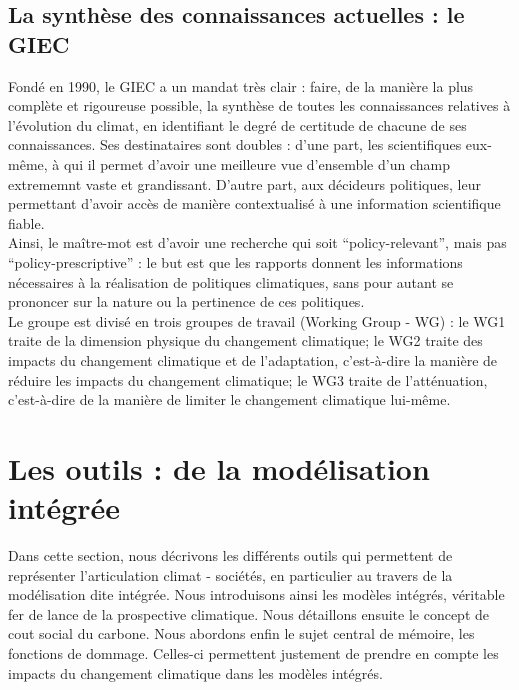 \subsection{La synthèse des connaissances actuelles : le GIEC}
\label{sect:1.2.3}

Fondé en 1990, le \Gls{GIEC} a un mandat très clair : faire, de la manière la plus complète et rigoureuse possible, la synthèse de toutes les connaissances relatives à l'évolution du climat, en identifiant le degré de certitude de chacune de ses connaissances. Ses destinataires sont doubles : d'une part, les scientifiques eux-même, à qui il permet d'avoir une meilleure vue d'ensemble d'un champ extrememnt vaste et grandissant. D'autre part, aux décideurs politiques, leur permettant d'avoir accès de manière contextualisé à une information scientifique fiable. \\

Ainsi, le maître-mot est d'avoir une recherche qui soit \enquote{policy-relevant}, mais pas \enquote{policy-prescriptive} : le but est que les rapports donnent les informations nécessaires à la réalisation de politiques climatiques, sans pour autant se prononcer sur la nature ou la pertinence de ces politiques. \\

Le groupe est divisé en trois groupes de travail (Working Group - WG)  : le WG1 traite de la dimension physique du changement climatique; le WG2 traite des impacts du changement climatique et de l'adaptation, c'est-à-dire la manière de réduire les impacts du changement climatique; le WG3 traite de l'atténuation, c'est-à-dire de la manière de limiter le changement climatique lui-même. 



\section{Les outils : de la modélisation intégrée}
\label{sect:1.3}

Dans cette section, nous décrivons les différents outils qui permettent de représenter l'articulation climat - sociétés, en particulier au travers de la modélisation dite intégrée. Nous introduisons ainsi les modèles intégrés, véritable fer de lance de la prospective climatique. Nous détaillons ensuite le concept de \gls{cout social du carbone}. Nous abordons enfin le sujet central de mémoire, les fonctions de dommage. Celles-ci permettent justement de prendre en compte les impacts du changement climatique dans les modèles intégrés. 

